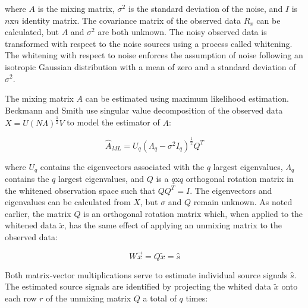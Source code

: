 \noindent where $A$ is the mixing matrix, $\sigma^2$ is the standard deviation of the noise, and $I$ is $n$x$n$ identity matrix. The covariance matrix of the observed data $R_x$ can be calculated, but $A$ and $\sigma^2$ are both unknown. The noisy observed data is transformed with respect to the noise sources using a process called whitening. The whitening with respect to noise enforces the assumption of noise following an isotropic Gaussian distribution with a mean of zero and a standard deviation of $\sigma^2$.

The mixing matrix $A$ can be estimated using maximum likelihood estimation. Beckmann and Smith use singular value decomposition of the observed data $X = U(N\Lambda)^{\frac{1}{2}} V$ to model the estimator of $A$:

\begin{equation}
\hat{A}_{ML} = U_q(\Lambda_q - \sigma ^2 I_q)^{\frac{1}{2}}Q^T
\end{equation}

\noindent where $U_q$ contains the eigenvectors associated with the $q$ largest eigenvalues, $\Lambda_q$ contains the $q$ largest eigenvalues, and $Q$ is a $q$x$q$ orthogonal rotation matrix in the whitened observation space such that $QQ^T = I$. %
The eigenvectors and eigenvalues can be calculated from $X$, but $\sigma$ and $Q$ remain unknown. As noted earlier, the matrix $Q$ is an orthogonal rotation matrix which, when applied to the whitened data $\tilde{x}$, has the same effect of applying an unmixing matrix to the observed data: 

\begin{equation}
\label{ch3:eq:unmixing-01}
W \vec{x} = Q \tilde{x} = \hat{s}
\end{equation}

\noindent Both matrix-vector multiplications serve to estimate individual source signals $\hat{s}$. The estimated source signals are identified by projecting the whited data $\tilde{x}$ onto each row $r$ of the unmixing matrix $Q$ a total of $q$ times:


